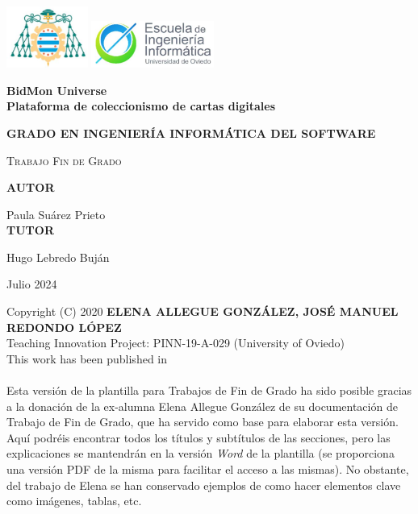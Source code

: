 \documentclass[11pt]{report} %
\begin{document}

\hypersetup{pageanchor=false}
\begin{titlepage}
	\centering
	\includegraphics[width=0.2\textwidth]{EscudoUniovi}
	\hspace{3 cm}
	\includegraphics[width=0.3\textwidth]{EscudoEscuela}
	\par\vspace{1cm}
	
	\vspace{1.5cm}
	{\huge\bfseries BidMon Universe \\ Plataforma de coleccionismo de cartas digitales\par}
	\vspace{2cm}
	{\large \textbf{GRADO EN INGENIERÍA INFORMÁTICA DEL SOFTWARE} \par}
	\vspace{1cm}
	{\scshape\Large Trabajo Fin de Grado\par}
   	
  \vspace{2cm}
	\textbf{AUTOR}\par
	Paula Suárez Prieto \\
	\vspace{1.5cm}
	\textbf{TUTOR}\par
	Hugo Lebredo Buján
	\vfill
	
	{\large Julio 2024 \par}
\end{titlepage}


\newpage
\pagestyle{plain}
Copyright (C) 2020 \textbf{ELENA ALLEGUE GONZÁLEZ, JOSÉ MANUEL REDONDO LÓPEZ} \\
Teaching Innovation Project: PINN-19-A-029 (University of Oviedo)\\
This work has been published in \cite{RedondoPlantillasRG19} \cite{RedondoUCO20}\\
\\
Esta versión de la plantilla para Trabajos de Fin de Grado ha sido posible gracias a la donación de la ex-alumna Elena Allegue González de su documentación de Trabajo de Fin de Grado, que ha servido como base para elaborar esta versión. Aquí podréis encontrar todos los títulos y subtítulos de las secciones, pero las explicaciones se mantendrán en la versión \textit{Word} de la plantilla (se proporciona una versión PDF de la misma para facilitar el acceso a las mismas). No obstante, del trabajo de Elena se han conservado ejemplos de como hacer elementos clave como imágenes, tablas, etc.
\end{document}
